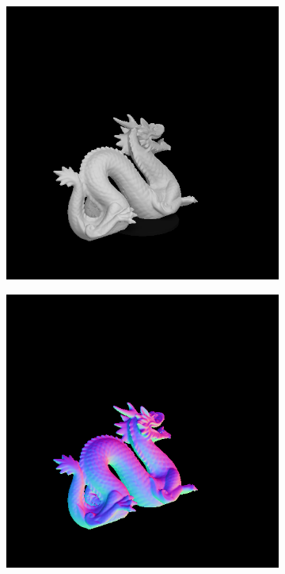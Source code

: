 \documentclass[border=15pt, multi, tikz]{article}
\begin{document}
\begin{figure}[H]
\begin{subfigure}[b]{0.20\linewidth}
	\end{subfigure}
	\begin{subfigure}[b]{0.20\linewidth}
		\includegraphics[width=\linewidth]{./Figures/test_scenes/05113.image0.png}
	\end{subfigure}
	\begin{subfigure}[b]{0.20\linewidth}
		\includegraphics[width=\linewidth]{./Figures/test_scenes/05113.normal0.png}
	\end{subfigure}
	

\end{figure}
\end{document}
